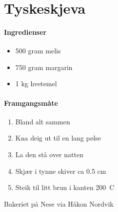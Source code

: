 \section{Tyskeskjeva}


\paragraph{Ingredienser}
\begin{itemize}[noitemsep]
	\item 500 gram melis
	\item 750 gram margarin
	\item 1 kg hvetemel
\end{itemize}

\paragraph{Framgangsmåte}
\begin{enumerate}[noitemsep]
	\item Bland alt sammen
	\item Kna deig ut til en lang pølse
	\item La den stå over natten
	\item Skjær i tynne skiver ca 0.5 cm
	\item Steik til litt brun i kanten 200\degree~C
\end{enumerate}

Bakeriet på Nese via Håkon Nordvik
